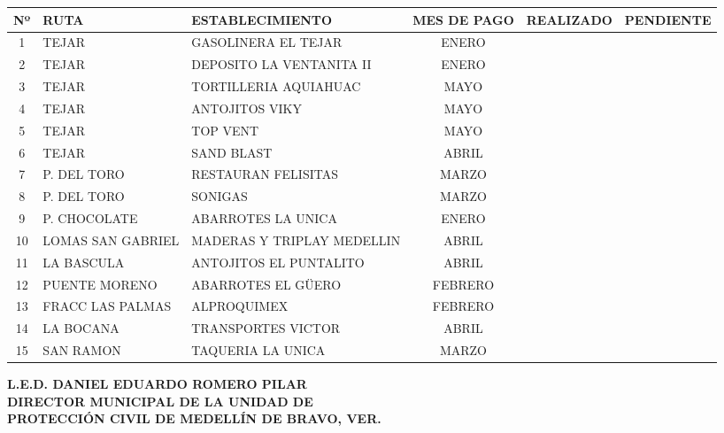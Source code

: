 \documentclass[11pt,letterpaper]{article}
\begin{document}
\vspace{0.2cm}

\noindent
\begin{tabularx}{\textwidth}{| c | >{\raggedright\arraybackslash}p{3.0cm} | X | c | p{2.2cm} | p{2.2cm} |}
\hline
\textbf{Nº} & \textbf{RUTA} & \textbf{ESTABLECIMIENTO} & \textbf{MES DE PAGO} & \textbf{REALIZADO} & \textbf{PENDIENTE} \\ \hline
  1 & TEJAR & GASOLINERA EL TEJAR & ENERO &  &  \\ \hline
  2 & TEJAR & DEPOSITO LA VENTANITA II & ENERO &  &  \\ \hline
  3 & TEJAR & TORTILLERIA AQUIAHUAC & MAYO &  &  \\ \hline
  4 & TEJAR & ANTOJITOS VIKY & MAYO &  &  \\ \hline
  5 & TEJAR & TOP VENT & MAYO &  &  \\ \hline
  6 & TEJAR & SAND BLAST & ABRIL &  &  \\ \hline
  7 & P. DEL TORO & RESTAURAN FELISITAS & MARZO &  &  \\ \hline
  8 & P. DEL TORO & SONIGAS & MARZO &  &  \\ \hline
  9 & P. CHOCOLATE & ABARROTES LA UNICA & ENERO &  &  \\ \hline
  10 & LOMAS SAN GABRIEL & MADERAS Y TRIPLAY MEDELLIN & ABRIL &  &  \\ \hline
  11 & LA BASCULA & ANTOJITOS EL PUNTALITO & ABRIL &  &  \\ \hline
  12 & PUENTE MORENO & ABARROTES EL GÜERO & FEBRERO &  &  \\ \hline
  13 & FRACC LAS PALMAS & ALPROQUIMEX & FEBRERO &  &  \\ \hline
  14 & LA BOCANA & TRANSPORTES VICTOR & ABRIL &  &  \\ \hline
  15 & SAN RAMON & TAQUERIA LA UNICA & MARZO &  &  \\ \hline
\end{tabularx}

\vfill

\begin{center}
    \textbf{L.E.D. DANIEL EDUARDO ROMERO PILAR}\\[0.2em]
    \textbf{DIRECTOR MUNICIPAL DE LA UNIDAD DE}\\[0.2em]
    \textbf{PROTECCIÓN CIVIL DE MEDELLÍN DE BRAVO, VER.}
\end{center}
\end{document}
